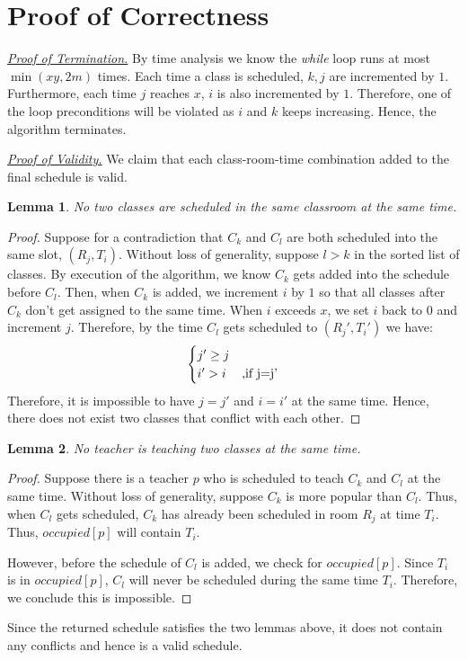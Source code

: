 \documentclass[11pt, oneside]{article}   	%
\newtheorem*{lem}{Lemma}
\begin{document}
\section{Proof of Correctness}
\underline{\textit{Proof of Termination.}} By time analysis we know the {\it while} loop runs at most $\min(xy, 2m)$ times. Each time a class is scheduled, $k, j$ are incremented by $1$. Furthermore, each time $j$ reaches $x$, $i$ is also incremented by $1$. Therefore, one of the loop preconditions will be violated as $i$ and $k$ keeps increasing. Hence, the algorithm terminates.

\underline{\textit{Proof of Validity.}}
We claim that each class-room-time combination added to the final schedule is valid. \\ \par
\begin{lem}No two classes are scheduled in the same classroom at the same time.\end{lem}
\begin{proof}Suppose for a contradiction that $C_k$ and $C_l$ are both scheduled into the same slot, $(R_j, T_i)$. Without loss of generality, suppose $l>k$ in the sorted list of classes. By execution of the algorithm, we know $C_k$ gets added into the schedule before $C_l$. Then, when $C_k$ is added, we increment $i$ by $1$ so that all classes after $C_k$ don't get assigned to the same time. When $i$ exceeds $x$, we set $i$ back to $0$ and increment $j$. Therefore, by the time $C_l$ gets scheduled to $(R_j', T_i')$ we have:
\[ \begin{cases} j'\geq j \\i'>i& \text{,if } $j=j'$ \end{cases}\]
Therefore, it is impossible to have $j=j'$ and $i=i'$ at the same time. Hence, there does not exist two classes that conflict with each other. \end{proof}
\begin{lem}No teacher is teaching two classes at the same time.\end{lem}
\begin{proof}Suppose there is a teacher $p$ who is scheduled to teach $C_k$ and $C_l$ at the same time. Without loss of generality, suppose $C_k$ is more popular than $C_l$. Thus, when $C_l$ gets scheduled, $C_k$ has already been scheduled in room $R_j$ at time $T_i$. Thus, $occupied[p]$ will contain $T_i$.\par
However, before the schedule of $C_l$ is added, we check for $occupied[p]$. Since $T_i$ is in $occupied[p]$, $C_l$ will never be scheduled during the same time $T_i$. Therefore, we conclude this is impossible. 
\end{proof}
Since the returned schedule satisfies the two lemmas above, it does not contain any conflicts and hence is a valid schedule.
\end{document}
